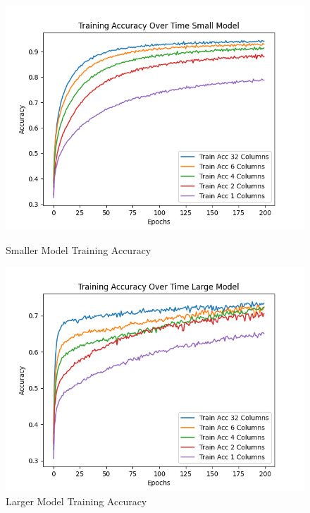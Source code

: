\documentclass{article}
\begin{document}
\begin{figure}[!htb]
		\includegraphics[width = \linewidth]{figures/train_acc_over_time_small.png}
		\caption{Smaller Model Training Accuracy}
	\endminipage\hfill
		\includegraphics[width = \linewidth]{figures/train_acc_over_time_large_model.png}
		\caption{Larger Model Training Accuracy}
	\endminipage\hfill	
\end{figure}
\end{document}
